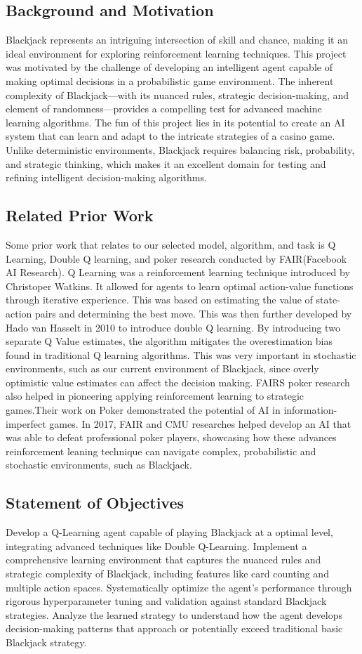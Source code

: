 \documentclass[10pt]{article}
\theoremstyle{definition}
\begin{document}
\subsection{Background and Motivation}
Blackjack represents an intriguing intersection of skill and chance, making it an ideal environment for exploring reinforcement learning techniques. This project was motivated by the challenge of developing an intelligent agent capable of making optimal decisions in a  probabilistic game environment. The inherent complexity of Blackjack—with its nuanced rules, strategic decision-making, and element of randomness—provides a compelling test for advanced machine learning algorithms.
The fun of this project lies in its potential to create an AI system that can learn and adapt to the intricate strategies of a casino game. Unlike deterministic environments, Blackjack requires balancing risk, probability, and strategic thinking, which makes it an excellent domain for testing and refining intelligent decision-making algorithms.

\subsection{Related Prior Work}
Some prior work that relates to our selected model, algorithm, and task is Q Learning, Double Q learning, and poker research conducted by FAIR(Facebook AI Research). Q Learning was a reinforcement learning technique introduced by Christoper Watkins. It allowed for agents to learn optimal action-value functions through iterative experience. This was based on estimating the value of state-action pairs and determining the best move. This was then further developed by Hado van Hasselt in 2010 to introduce double Q learning. By introducing two separate Q Value estimates, the algorithm mitigates the overestimation bias found in traditional Q learning algorithms. This was very important in stochastic environments, such as our current environment of Blackjack, since overly optimistic value estimates can affect the decision making. FAIRS poker research also helped in pioneering applying reinforcement learning to strategic games.Their work on Poker demonstrated the potential of AI in information-imperfect games. In 2017, FAIR and CMU researches helped develop an AI that was able to defeat professional poker players, showcasing how these advances reinforcement leaning technique can navigate complex, probabilistic and stochastic environments, such as Blackjack.
\subsection{Statement of Objectives}
Develop a Q-Learning agent capable of playing Blackjack at a optimal level, integrating advanced techniques like Double Q-Learning.
Implement a comprehensive learning environment that captures the nuanced rules and strategic complexity of Blackjack, including features like card counting and multiple action spaces.
Systematically optimize the agent's performance through rigorous hyperparameter tuning and validation against standard Blackjack strategies.
Analyze the learned strategy to understand how the agent develops decision-making patterns that approach or potentially exceed traditional basic Blackjack strategy.
\end{document}
